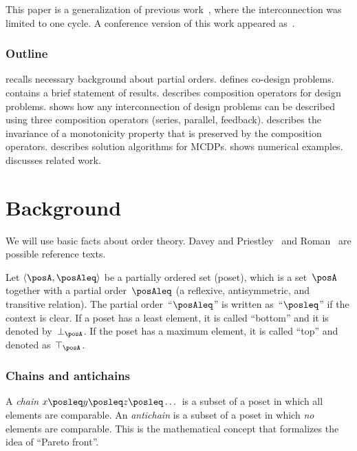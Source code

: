 This paper is a generalization of previous work~\cite{censi15monotone},
where the interconnection was limited to one cycle. A conference
version of this work appeared as~\cite{censi15same}.

 

\subsubsection*{Outline}

 recalls necessary background about partial orders.
 defines co-design problems. 
contains a brief statement of results.  describes
composition operators for design problems. 
shows how any interconnection of design problems can be described
using three composition operators (series, parallel, feedback). 
describes the invariance of a monotonicity property that is preserved
by the composition operators.  describes
solution algorithms for MCDPs.  shows
numerical examples.  discusses related
work.



\section{Background\label{sec:Background}}

We will use basic facts about order theory. Davey and Priestley~\cite{davey02}
and Roman~\cite{roman08} are possible reference texts.

Let $\left\langle \posA,\posAleq\right\rangle $ be a partially ordered
set (poset), which is a set~$\posA$ together with a partial order~$\posAleq$
(a reflexive, antisymmetric, and transitive relation). The partial
order~``$\posAleq$'' is written as~``$\posleq$'' if the context
is clear. If a poset has a least element, it is called ``bottom''
and it is denoted by~$\bot_{\posA}$. If the poset has a maximum
element, it is called ``top'' and denoted as~$\top_{\posA}$.

\subsubsection*{Chains and antichains}

A \emph{chain} $x\posleq y\posleq z\posleq\dots$ is a subset of a
poset in which all elements are comparable. An \emph{antichain} is
a subset of a poset in which \emph{no} elements are comparable. This
is the mathematical concept that formalizes the idea of ``Pareto
front''.

